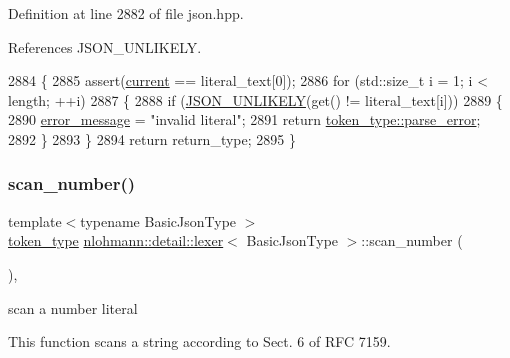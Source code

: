 Definition at line 2882 of file json.\+hpp.



References J\+S\+O\+N\+\_\+\+U\+N\+L\+I\+K\+E\+LY.


\begin{DoxyCode}
2884     \{
2885         assert(\hyperlink{classnlohmann_1_1detail_1_1lexer_a47169f9aaf0da4c9885e61d3109859aa}{current} == literal\_text[0]);
2886         \textcolor{keywordflow}{for} (std::size\_t i = 1; i < length; ++i)
2887         \{
2888             \textcolor{keywordflow}{if} (\hyperlink{json_8hpp_ab77582407c64944e7db1ea95ab520253}{JSON\_UNLIKELY}(\textcolor{keyword}{get}() != literal\_text[i]))
2889             \{
2890                 \hyperlink{classnlohmann_1_1detail_1_1lexer_ae2a15e440f1889e0ab0c6a35344e48df}{error\_message} = \textcolor{stringliteral}{"invalid literal"};
2891                 \textcolor{keywordflow}{return} \hyperlink{classnlohmann_1_1detail_1_1lexer_a3f313cdbe187cababfc5e06f0b69b098a456e19aeafa334241c7ff3f589547f9d}{token\_type::parse\_error};
2892             \}
2893         \}
2894         \textcolor{keywordflow}{return} return\_type;
2895     \}
\end{DoxyCode}
\mbox{\label{classnlohmann_1_1detail_1_1lexer_a6bd7e6cdb0380a9df663f1c7f115f34f}} 
\subsubsection{\texorpdfstring{scan\+\_\+number()}{scan\_number()}}
{\footnotesize\ttfamily template$<$typename Basic\+Json\+Type $>$ \\
\hyperlink{classnlohmann_1_1detail_1_1lexer_a3f313cdbe187cababfc5e06f0b69b098}{token\+\_\+type} \hyperlink{classnlohmann_1_1detail_1_1lexer}{nlohmann\+::detail\+::lexer}$<$ Basic\+Json\+Type $>$\+::scan\+\_\+number (\begin{DoxyParamCaption}{ }\end{DoxyParamCaption})\hspace{0.3cm}{\ttfamily [inline]}, {\ttfamily [private]}}



scan a number literal 

This function scans a string according to Sect. 6 of R\+FC 7159.


